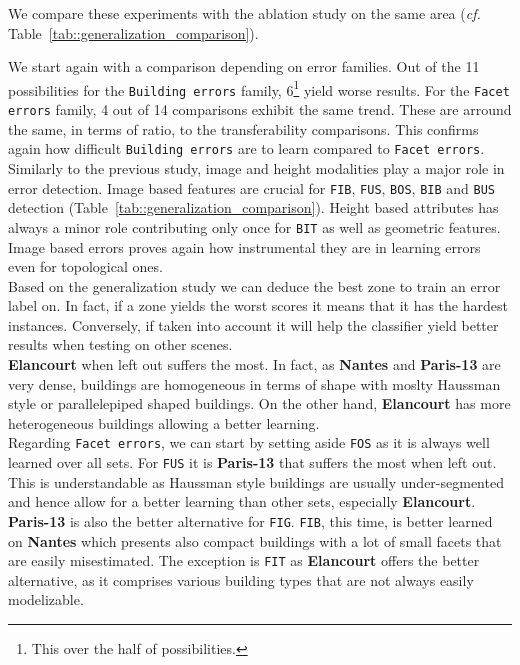         We compare these experiments with the ablation study on the same area (\textit{cf.} Table~\ref{tab::generalization_comparison}).
    
        We start again with a comparison depending on error families.
        Out of the 11 possibilities for the \texttt{Building errors} family, 6\footnote{This over the half of possibilities.} yield worse results.
        For the \texttt{Facet errors} family, 4 out of 14 comparisons exhibit the same trend.
        These are arround the same, in terms of ratio, to the transferability comparisons.
        This confirms again how difficult \texttt{Building errors} are to learn compared to \texttt{Facet errors}.\\
        
        Similarly to the previous study, image and height modalities play a major role in error detection.
        Image based features are crucial for \texttt{FIB}, \texttt{FUS}, \texttt{BOS}, \texttt{BIB} and \texttt{BUS} detection (Table~\ref{tab::generalization_comparison}).
        Height based attributes has always a minor role contributing only once for \texttt{BIT} as well as geometric features.
        Image based errors proves again how instrumental they are in learning errors even for topological ones.\\
        
        Based on the generalization study we can deduce the best zone to train an error label on.
        In fact, if a zone yields the worst scores it means that it has the hardest instances.
        Conversely, if taken into account it will help the classifier yield better results when testing on other scenes.\\

        \textbf{Elancourt} when left out suffers the most.
        In fact, as \textbf{Nantes} and \textbf{Paris-13} are very dense, buildings are homogeneous in terms of shape with moslty Haussman style or parallelepiped shaped buildings.
        On the other hand, \textbf{Elancourt} has more heterogeneous buildings allowing a better learning.\\
        
        Regarding \texttt{Facet errors}, we can start by setting aside \texttt{FOS} as it is always well learned over all sets.
        For \texttt{FUS} it is \textbf{Paris-13} that suffers the most when left out.
        This is understandable as Haussman style buildings are usually under-segmented and hence allow for a better learning than other sets, especially \textbf{Elancourt}.
        \textbf{Paris-13} is also the better alternative for \texttt{FIG}.
        \texttt{FIB}, this time, is better learned on \textbf{Nantes} which presents also compact buildings with a lot of small facets that are easily misestimated.
        The exception is \texttt{FIT} as \textbf{Elancourt} offers the better alternative, as it comprises various building types that are not always easily modelizable.
    
